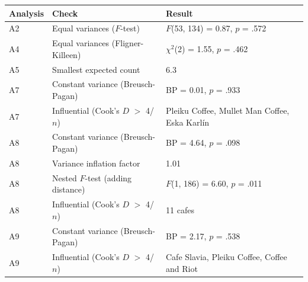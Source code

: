 \begin{tabular}{lll}
\toprule
Analysis & Check & Result \\
\midrule
A2 & Equal variances ($F$-test) & $F$(53, 134) = 0.87, $p$ = .572 \\
A4 & Equal variances (Fligner-Killeen) & $\chi^2$(2) = 1.55, $p$ = .462 \\
A5 & Smallest expected count & 6.3 \\
A7 & Constant variance (Breusch-Pagan) & BP = 0.01, $p$ = .933 \\
A7 & Influential (Cook's $D$ $>$ 4/$n$) & Pleiku Coffee, Mullet Man Coffee, Eska Karlín \\
A8 & Constant variance (Breusch-Pagan) & BP = 4.64, $p$ = .098 \\
A8 & Variance inflation factor & 1.01 \\
A8 & Nested $F$-test (adding distance) & $F$(1, 186) = 6.60, $p$ = .011 \\
A8 & Influential (Cook's $D$ $>$ 4/$n$) & 11 cafes \\
A9 & Constant variance (Breusch-Pagan) & BP = 2.17, $p$ = .538 \\
A9 & Influential (Cook's $D$ $>$ 4/$n$) & Cafe Slavia, Pleiku Coffee, Coffee and Riot \\
\bottomrule
\end{tabular}
